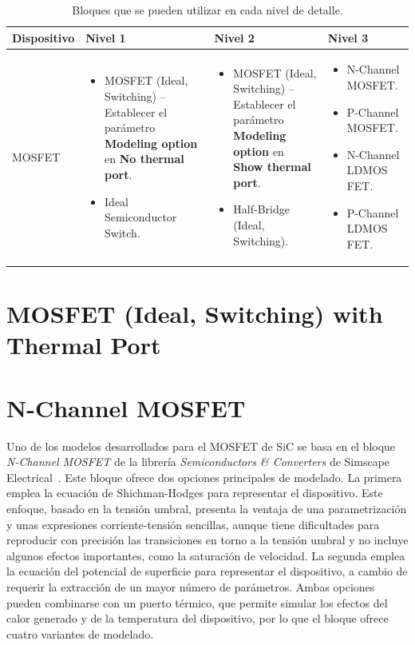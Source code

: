 \begin{longtable}{|p{2.2cm}|p{4.2cm}|p{4.2cm}|p{4.2cm}|}
    \caption{Bloques que se pueden utilizar en cada nivel de detalle. \cite{mathworks_choose_semiconductor}}
    \label{tab:mosfet_fidelity} \\ 
    \hline
    \textbf{Dispositivo} & \textbf{Nivel 1} & \textbf{Nivel 2} & \textbf{Nivel 3} \\
    \hline
    \endhead 

    MOSFET & 
    \begin{itemize}
        \item MOSFET (Ideal, Switching) -- Establecer el parámetro \textbf{Modeling option} en \textbf{No thermal port}.
        \item Ideal Semiconductor Switch.
    \end{itemize} & 
    \begin{itemize}
        \item MOSFET (Ideal, Switching) -- Establecer el parámetro \textbf{Modeling option} en \textbf{Show thermal port}.
        \item Half-Bridge (Ideal, Switching).
    \end{itemize} & 
    \begin{itemize}
        \item N-Channel MOSFET.
        \item P-Channel MOSFET.
        \item N-Channel LDMOS FET.
        \item P-Channel LDMOS FET.
    \end{itemize} \\
    \hline
\end{longtable}

\section{MOSFET (Ideal, Switching) with Thermal Port}

\section{N-Channel MOSFET}

Uno de los modelos desarrollados para el MOSFET de SiC se basa en el bloque \textit{N-Channel MOSFET} de la librería \textit{Semiconductors \& Converters} de Simscape Electrical~\cite{MathWorks_NChannelMOSFET}. Este bloque ofrece dos opciones principales de modelado. La primera emplea la ecuación de Shichman-Hodges para representar el dispositivo. Este enfoque, basado en la tensión umbral, presenta la ventaja de una parametrización y unas expresiones corriente-tensión sencillas, aunque tiene dificultades para reproducir con precisión las transiciones en torno a la tensión umbral y no incluye algunos efectos importantes, como la saturación de velocidad. La segunda emplea la ecuación del potencial de superficie para representar el dispositivo, a cambio de requerir la extracción de un mayor número de parámetros. Ambas opciones pueden combinarse con un puerto térmico, que permite simular los efectos del calor generado y de la temperatura del dispositivo, por lo que el bloque ofrece cuatro variantes de modelado.


